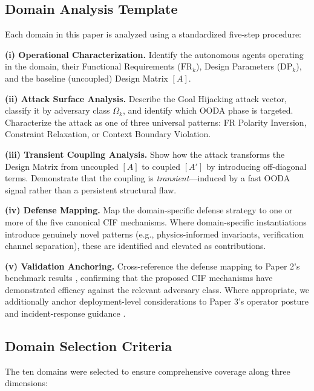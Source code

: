 \documentclass[
]{article}
\begin{document}
\subsection{Domain Analysis Template}\label{domain-analysis-template}

Each domain in this paper is analyzed using a standardized five-step
procedure:

\textbf{(i) Operational Characterization.} Identify the autonomous
agents operating in the domain, their Functional Requirements
(\(\text{FR}_k\)), Design Parameters (\(\text{DP}_k\)), and the baseline
(uncoupled) Design Matrix \([A]\).

\textbf{(ii) Attack Surface Analysis.} Describe the Goal Hijacking
attack vector, classify it by adversary class \(\Omega_k\), and identify
which OODA phase is targeted. Characterize the attack as one of three
universal patterns: FR Polarity Inversion, Constraint Relaxation, or
Context Boundary Violation.

\textbf{(iii) Transient Coupling Analysis.} Show how the attack
transforms the Design Matrix from uncoupled \([A]\) to coupled \([A']\)
by introducing off-diagonal terms. Demonstrate that the coupling is
\emph{transient}---induced by a fast OODA signal rather than a
persistent structural flaw.

\textbf{(iv) Defense Mapping.} Map the domain-specific defense strategy
to one or more of the five canonical CIF mechanisms. Where
domain-specific instantiations introduce genuinely novel patterns (e.g.,
physics-informed invariants, verification channel separation), these are
identified and elevated as contributions.

\textbf{(v) Validation Anchoring.} Cross-reference the defense mapping
to Paper 2's benchmark results \cite{friedman2026cogsec2}, confirming
that the proposed CIF mechanisms have demonstrated efficacy against the
relevant adversary class. Where appropriate, we additionally anchor
deployment-level considerations to Paper 3's operator posture and
incident-response guidance \cite{friedman2026cogsec3}.

\subsection{Domain Selection Criteria}\label{domain-selection-criteria}

The ten domains were selected to ensure comprehensive coverage along
three dimensions:
\end{document}
